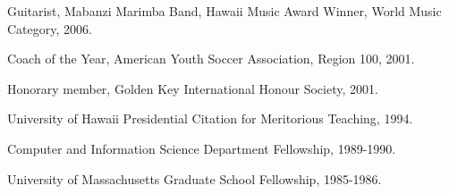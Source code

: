\begin{Awards and Honors}

\item Guitarist, Mabanzi Marimba Band, Hawaii Music Award Winner, World Music Category, 2006.
\item Coach of the Year, American Youth Soccer Association, Region 100, 2001.
\item Honorary member, Golden Key International Honour Society, 2001.
\item University of Hawaii Presidential Citation for Meritorious Teaching, 1994.
\item Computer and Information Science Department Fellowship, 1989-1990.
\item University of Massachusetts Graduate School Fellowship, 1985-1986.

\end{Awards and Honors}








